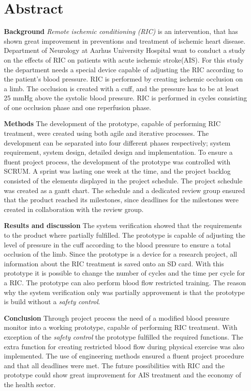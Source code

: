 \chapter*{Abstract}
\textbf{Background} \textit{Remote ischemic conditioning (RIC)} is an intervention, that has shown great improvement in preventions and treatment of ischemic heart disease. Department of Neurology at Aarhus University Hospital want to conduct a study on the effects of RIC on patients with acute ischemic stroke(AIS). For this study the department needs a special device capable of adjusting the RIC according to the patient's blood pressure. RIC is performed by creating ischemic occlusion on a limb. The occlusion is created with a cuff, and the pressure has to be at least 25 mmHg above the systolic blood pressure. RIC is performed in cycles consisting of one occlusion phase and one reperfusion phase. 

\textbf{Methods} The development of the prototype, capable of performing RIC treatment, were created using both agile and iterative processes. The development can be separated into four different phases respectively; system requirement, system design, detailed design and implementation. To ensure a fluent project process, the development of the prototype was controlled with SCRUM. A sprint was lasting one week at the time, and the project backlog consisted of the elements displayed in the project schedule. The project schedule was created as a gantt chart. The schedule and a dedicated review group ensured that the product reached its milestones, since deadlines for the milestones were created in collaboration with the review group. 

\textbf{Results and discussion} The system verification showed that the requirements to the product where partially fulfilled. The prototype is capable of adjusting the level of pressure in the cuff according to the blood pressure to ensure a total occlusion of the limb. Since the prototype is a device for a research project, all information about the RIC treatment is saved onto an SD card. With this prototype it is possible to change the number of cycles and the time per cycle for a RIC. The prototype can also perform blood flow restricted training. The reason why the system verification only was partially approvement is that the prototype is build without a \textit{safety control}. 

\textbf{Conclusion}
Through project process the need of a modified blood pressure monitor into a working prototype, capable of performing RIC treatment. With exception of the \textit{safety control} the prototype fulfilled the required functions. The extra function for creating restricted blood flow during physical exercise was also implemented. The use of engineering methods ensured a fluent project procedure and that all deadlines were met. The future possibilities with RIC and the prototype could show great improvement for AIS treatment and the economy of the health sector. 